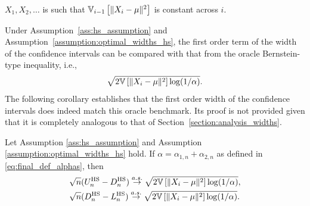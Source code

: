 \begin{assumption} \label{assumption:optimal_widths_hs}
 $X_1, X_2, \ldots$ is such that $\mathbb{V}_{i-1} \left[ \| X_i-\mu\|^2 \right]$ is constant across $i$.
\end{assumption}

Under Assumption~\ref{ass:hs_assumption} and Assumption~\ref{assumption:optimal_widths_hs}, the first order term of the width of the confidence intervals can be compared with that from the oracle Bernstein-type inequality, i.e., $$\sqrt{2 \mathbb{V} \left[ \|X_i-\mu\|^2\right] \log (1 / \alpha)}.$$
The following corollary establishes that the first order width of the confidence intervals does indeed match this oracle benchmark. Its proof is not provided given that it is completely analogous to that of Section~\ref{section:analysis_widths}. 

\begin{corollary} [Sharpness]
Let Assumption \ref{ass:hs_assumption} and Assumption \ref{assumption:optimal_widths_hs} hold. If $\alpha = \alpha_{1, n} + \alpha_{2, n}$ as defined in \eqref{eq:final_def_alphas}, then
\begin{align*}
    &\sqrt{n} (U_n^{\text{HS}}  - D_n^{\text{HS}} ) \stackrel{a.s.}{\to} \sqrt{2 \mathbb{V} \left[ \|X_i-\mu\|^2\right] \log (1 / \alpha)}, 
    \\ &\sqrt{n} (D_n^{\text{HS}}  - L_n^{\text{HS}} ) \stackrel{a.s.}{\to} \sqrt{2 \mathbb{V} \left[ \|X_i-\mu\|^2\right] \log (1 / \alpha)}.
\end{align*}
\end{corollary}







